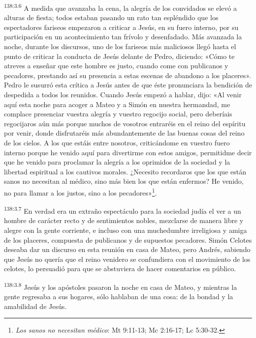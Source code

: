 \par 
\textsuperscript{138:3.6} A medida que avanzaba la cena, la alegría de los convidados se elevó a alturas de fiesta; todos estaban pasando un rato tan espléndido que los espectadores fariseos empezaron a criticar a Jesús, en su fuero interno, por su participación en un acontecimiento tan frívolo y desenfadado. Más avanzada la noche, durante los discursos, uno de los fariseos más maliciosos llegó hasta el punto de criticar la conducta de Jesús delante de Pedro, diciendo: «Cómo te atreves a enseñar que este hombre es justo, cuando come con publicanos y pecadores, prestando así su presencia a estas escenas de abandono a los placeres». Pedro le susurró esta crítica a Jesús antes de que éste pronunciara la bendición de despedida a todos los reunidos. Cuando Jesús empezó a hablar, dijo: «Al venir aquí esta noche para acoger a Mateo y a Simón en nuestra hermandad, me complace presenciar vuestra alegría y vuestro regocijo social, pero deberíais regocijaros aún más porque muchos de vosotros entraréis en el reino del espíritu por venir, donde disfrutaréis más abundantemente de las buenas cosas del reino de los cielos. A los que estáis entre nosotros, criticándome en vuestro fuero interno porque he venido aquí para divertirme con estos amigos, permitidme decir que he venido para proclamar la alegría a los oprimidos de la sociedad y la libertad espiritual a los cautivos morales. ¿Necesito recordaros que los que están sanos no necesitan al médico, sino más bien los que están enfermos? He venido, no para llamar a los justos, sino a los pecadores»\footnote{\textit{Los sanos no necesitan médico}: Mt 9:11-13; Mc 2:16-17; Lc 5:30-32.}.

\par 
\textsuperscript{138:3.7} En verdad era un extraño espectáculo para la sociedad judía el ver a un hombre de carácter recto y de sentimientos nobles, mezclarse de manera libre y alegre con la gente corriente, e incluso con una muchedumbre irreligiosa y amiga de los placeres, compuesta de publicanos y de supuestos pecadores. Simón Celotes deseaba dar un discurso en esta reunión en casa de Mateo, pero Andrés, sabiendo que Jesús no quería que el reino venidero se confundiera con el movimiento de los celotes, lo persuadió para que se abstuviera de hacer comentarios en público.

\par 
\textsuperscript{138:3.8} Jesús y los apóstoles pasaron la noche en casa de Mateo, y mientras la gente regresaba a sus hogares, sólo hablaban de una cosa: de la bondad y la amabilidad de Jesús.

